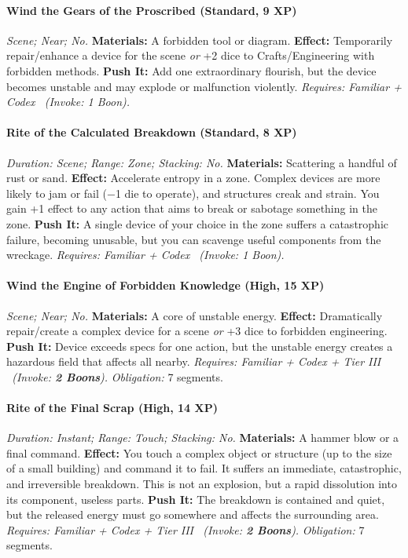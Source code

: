 \documentclass[12pt,twoside]{book}
\begin{document}
\paragraph{Wind the Gears of the Proscribed (Standard, 9 XP)} \emph{Scene; Near; No.}
\textbf{Materials:} A forbidden tool or diagram.
\textbf{Effect:} Temporarily repair/enhance a device for the scene \emph{or} +2 dice to Crafts/Engineering with forbidden methods.
\textbf{Push It:} Add one extraordinary flourish, but the device becomes unstable and may explode or malfunction violently.
\emph{Requires: Familiar + Codex \ (\textit{Invoke:} 1 Boon).}
\paragraph{Rite of the Calculated Breakdown (Standard, 8 XP)} \emph{Duration: Scene; Range: Zone; Stacking: No.}
\textbf{Materials:} Scattering a handful of rust or sand.
\textbf{Effect:} Accelerate entropy in a zone. Complex devices are more likely to jam or fail (−1 die to operate), and structures creak and strain. You gain +1 effect to any action that aims to break or sabotage something in the zone.
\textbf{Push It:} A single device of your choice in the zone suffers a catastrophic failure, becoming unusable, but you can scavenge useful components from the wreckage.
\emph{Requires: Familiar + Codex \ (\textit{Invoke:} 1 Boon).}
\paragraph{Wind the Engine of Forbidden Knowledge (High, 15 XP)} \emph{Scene; Near; No.}
\textbf{Materials:} A core of unstable energy.
\textbf{Effect:} Dramatically repair/create a complex device for a scene \emph{or} +3 dice to forbidden engineering.
\textbf{Push It:} Device exceeds specs for one action, but the unstable energy creates a hazardous field that affects all nearby.
\emph{Requires: Familiar + Codex + Tier III \ (\textit{Invoke:} \textbf{2 Boons}).}
\emph{Obligation:} 7 segments.

\paragraph{Rite of the Final Scrap (High, 14 XP)} \emph{Duration: Instant; Range: Touch; Stacking: No.}
\textbf{Materials:} A hammer blow or a final command.
\textbf{Effect:} You touch a complex object or structure (up to the size of a small building) and command it to fail. It suffers an immediate, catastrophic, and irreversible breakdown. This is not an explosion, but a rapid dissolution into its component, useless parts.
\textbf{Push It:} The breakdown is contained and quiet, but the released energy must go somewhere and affects the surrounding area.
\emph{Requires: Familiar + Codex + Tier III \ (\textit{Invoke:} \textbf{2 Boons}).}
\emph{Obligation:} 7 segments.
\end{document}
